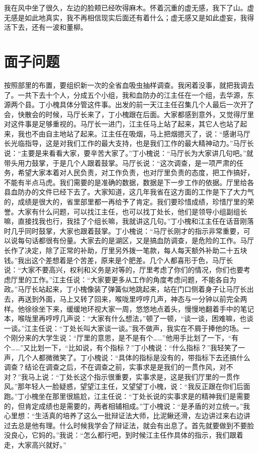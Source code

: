 \documentclass[12pt,oneside]{book}
\begin{document}
我在风中坐了很久，左边的脸颊已经吹得麻木。怀着沉重的虚无感，我下了山。虚无感是如此地真实，我不再相信现实后面还有着什么；虚无感又是如此虚妄，我得活下去，还有一波和董柳。


\chapter{面子问题}

按照部里的布置，要组织新一次的全省血吸虫抽样调查。我闲着没事，就把我调去了。一共下去十个人，分成五个小组，我和血防办的江主任在一个组，去华源，东源两个县。丁小槐具体分管这件事。出发的前一天江主任召集几个人最后一次开了会，快散会的时候，马厅长来了，丁小槐跟在后面。大家都感到意外，又觉得厅里对这件事是足够重视的。马厅长一进门，江主任马上站了起来，其它人也站了起来，我也不由自主地站了起来。江主任在吸烟，马上把烟摁灭了，说：``感谢马厅长光临指导，这是对我们工作的最大支持，也是我们工作的最大精神动力。''马厅长说：``主要是来看看大家，要辛苦大家了。''丁小槐说：``马厅长为大家讲几句吧。''就带头用力鼓掌，于是几个人跟着鼓掌。马厅长说：``这次调查，是一项严肃的任务，希望大家本着对人民负责，对工作负责，也对厅里负责的态度，把工作搞好，不能有半点马虎。我们需要的是准确的数据，数据是下一步工作的依据。厅里给各县血防办的文件已经下去了。大家知道，这几年我省在这方面的工作是下了大力气的，成绩是很大的，省里部里都一再给予了肯定。我们要珍惜成绩，珍惜厅里的荣誉。大家有什么问题，可以找江主任，也可以找丁处长，他们是领导小组副组长嘛，直接找我也行，我挂了个组长嘛，我就讲这几句。''丁小槐和江主任在话音刚落时几乎同时鼓掌，大家也跟着鼓掌。丁小槐说：``马厅长刚才的指示非常重要，可以说每句话都很有份量。大家去的是湖区，又是搞血防调查，是危险的工作。马厅长作了决定，除了正常的补助，厅里另外拨一笔款，每人每天额外补助二十五块钱。''我出这个差想着是个苦差，原来是个肥差。几个人都喜形于色，马厅长说：``大家不要高兴，权利和义务是对等的，厅里考虑了你们的情况，你们也要考虑厅里的工作。''江主任说：``大家要更多从工作的角度考虑问题，不能各自为政。''马厅长站起来，丁小槐像装了弹簧似地跳起来，站在门口侧着身子让马厅长出去，再送到外面，马上又转了回来，喉咙里哼哼几声，神态与一分钟以前完全两样。他徐徐坐下来，缓缓地环视大家一周，悠悠地点着头，慢慢地翻着手中的笔记本，喉咙里再哼哼几声说：``大家有什么想法，''顿了一顿，``谈一谈，困难嘛，也谈一谈。''江主任说：``丁处长叫大家谈一谈。''我不做声，我实在不屑于捧他的场。一个刚分来的大学生说：``厅里的意思，是不是有个\ldots\ldots{}''他用手比划了一下，``有个\ldots\ldots{}''又比划一下，``比如说，有个指标？''丁小槐说：``什么指标？''我轻笑了一声，几个人都微微笑了。丁小槐说：``具体的指标是没有的，带指标下去还搞什么调查？结论在调查之后，不在调查之前，实事求是是我们的一贯作风，对不对？''我马上说：``丁处长这个指示很重要，实事求是，这是我们厅里的一贯作风。''那年轻人一脸疑惑，望望江主任，又望望丁小槐，说：``我反正跟在你们后面跑。''丁小槐坐在那里很尴尬，江主任说：``丁处长说的实事求是的精神我们是需要的，但肯定成绩也是需要的，两者相辅相成。''丁小槐说：``是矛盾的对立统一。''我心里想：``生活真的培养了这么一批辩证法大师，比泥鳅还滑，左边讲过来右边讲过去总是他有理。什么时候我学会了辩证法，就会有出息了。首先就要做到不要脸没良心，它妈的。''我说：``怎么都行吧，到时候江主任作具体的指示，我们跟着走，大家高兴就好。''
\end{document}
